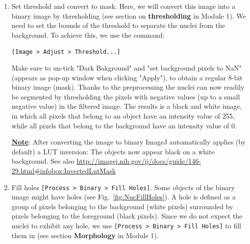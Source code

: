 \documentclass[11pt,a4paper,oneside]{report}
\newcommand{\ijmenu}[1]{\texttt{\small#1}}
\begin{document}
\begin{enumerate}
    \item Set threshold and convert to mask. 
    Here, we will convert this image into a binary image by thresholding (see section on \textbf{thresholding} in Module 1). We need to set the bounds of the threshold to separate the nuclei from the background. To achieve this, we use the command:
   
    \ijmenu{[Image >  Adjust > Threshold...]}
    
    Make sure to un-tick "Dark Bakground" and "set background pixels to NaN" (appears as pop-up window when clicking "Apply"), to obtain a regular 8-bit binary image (mask). Thanks to the preprocessing the nuclei can now readily be segmented by thresholding the pixels with negative values (up to a small negative value) in the filtered image. 
    The results is a black and white image, in which all pixels that belong to an object have an intensity value of 255, while all pixels that belong to the background have an intensity value of 0. 
    
    \textbf{\underline{Note}}: After converting the image to binary ImageJ automatically applies (by default) a LUT inversion: The objects now appear black on a white background. See also  \url{http://imagej.nih.gov/ij/docs/guide/146-29.html#infobox:InvertedLutMask}
    

    \item Fill holes
    \ijmenu{[Process >  Binary > Fill Holes]}.
    Some objects of the binary image might have holes (see Fig.~\ref{fig:NucFillHoles}). A hole is defined as a group of pixels belonging to the background (white pixels) surrounded by pixels belonging to the foreground (black pixels). Since we do not expect the nuclei to exhibit any hole, we use \ijmenu{[Process > Binary > Fill Holes]} to fill them in (see section \textbf{Morphology} in Module 1).
    

\end{enumerate}
\end{document}
